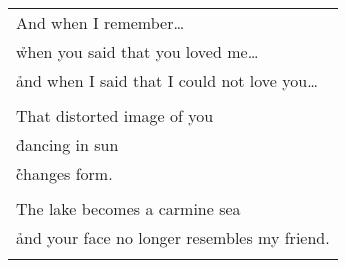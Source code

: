 \documentclass{article}
\begin{document}
\begin{center}
\begin{tabular}{l}
\\
And when I remember\ldots{} \\
\h when you said that you loved me\ldots{} \\
\h and when I said that I could not love you\ldots{} \\
\\
That distorted image of you \\
\h dancing in sun \\
\h\h changes form. \\
\\
The lake becomes a carmine sea \\
\h and your face no longer resembles my friend. \\
\\
\end{tabular}
%
%
%
%
%

\end{center}
\end{document}
